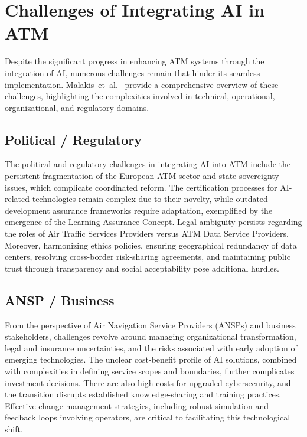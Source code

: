 \section{Challenges of Integrating AI in ATM}

Despite the significant progress in enhancing \gls{ATM} systems through the integration of \gls{AI}, numerous challenges remain that hinder its seamless implementation. 
Malakis~et~al.~\cite{Malakis_2022} provide a comprehensive overview of these challenges, highlighting the complexities involved in technical, operational, organizational, and regulatory domains. 


\subsection{Political / Regulatory}

The political and regulatory challenges in integrating \gls{AI} into \gls{ATM} include the persistent fragmentation of the European \gls{ATM} sector and state sovereignty issues, which complicate coordinated reform. 
The certification processes for \gls{AI}-related technologies remain complex due to their novelty, while outdated development assurance frameworks require adaptation, exemplified by the emergence of the Learning Assurance Concept. 
Legal ambiguity persists regarding the roles of Air Traffic Services Providers versus \gls{ATM} Data Service Providers. 
Moreover, harmonizing ethics policies, ensuring geographical redundancy of data centers, resolving cross-border risk-sharing agreements, and maintaining public trust through transparency and social acceptability pose additional hurdles.

\subsection{ANSP / Business}

From the perspective of Air Navigation Service Providers (ANSPs) and business stakeholders, challenges revolve around managing organizational transformation, legal and insurance uncertainties, and the risks associated with early adoption of emerging technologies. 
The unclear cost-benefit profile of \gls{AI} solutions, combined with complexities in defining service scopes and boundaries, further complicates investment decisions. 
There are also high costs for upgraded cybersecurity, and the transition disrupts established knowledge-sharing and training practices.
Effective change management strategies, including robust simulation and feedback loops involving operators, are critical to facilitating this technological shift.

